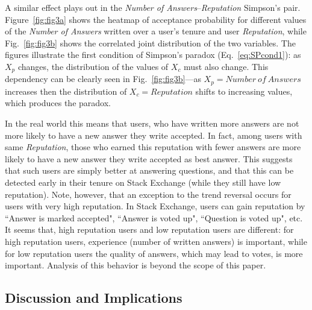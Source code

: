 A similar effect plays out in the \textit{Number of Answers}--\textit{Reputation} Simpson's pair. Figure~\ref{fig:fig3a} shows the heatmap of acceptance probability for different values of the \textit{Number of Answers} written over a user's tenure and user \textit{Reputation}, while Fig.~\ref{fig:fig3b} shows the correlated joint distribution of the two variables.
The figures illustrate the first condition of Simpson's paradox (Eq.~\eqref{eq:SPcond1}): as $X_p$ changes, the distribution of the values of $X_c$ must also change. This dependency can be clearly seen in Fig.~\ref{fig:fig3b}---as $X_p=Number\ of\ Answers$ increases then the distribution of $X_c=Reputation$ shifts to increasing values, which produces the paradox.

In the real world this means that users, who have written more answers are not more likely to have a new answer they write accepted. In fact, among users with same \textit{Reputation}, those who earned this reputation with fewer answers are more likely to have a new answer they write accepted as best answer. This suggests that such users are simply better at answering questions, and that this can be detected early in their tenure on Stack Exchange (while they still have low reputation). %
{Note, however, that an exception to the trend reversal occurs for users with very high reputation. In Stack Exchange, users can gain reputation by ``Answer is marked accepted", ``Answer is voted up", ``Question is voted up", etc. It seems that, high reputation users and low reputation users are different: for high reputation users, experience (number of written answers) is important, while for low reputation users the quality of answers, which may lead to votes, is more important. Analysis of this behavior is beyond the scope of this paper. }

\subsection{Discussion and Implications}

